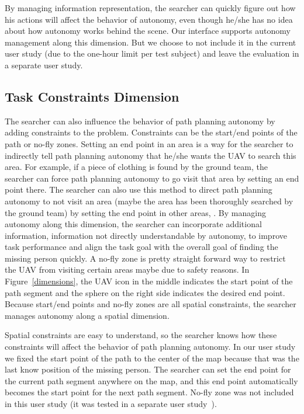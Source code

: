 \documentclass[journal]{IEEEtran}
\begin{document}
By managing information representation, the searcher can quickly figure out how his actions will affect the behavior of autonomy, even though he/she has no idea about how autonomy works behind the scene. Our interface supports autonomy management along this dimension. But we choose to not include it in the current user study (due to the one-hour limit per test subject) and leave the evaluation in a separate user study.

\subsection{Task Constraints Dimension}

The searcher can also influence the behavior of path planning autonomy by adding constraints to the problem. Constraints can be the start/end points of the path or no-fly zones. Setting an end point in an area is a way for the searcher to indirectly tell path planning autonomy that he/she wants the UAV to search this area. For example, if a piece of clothing is found by the ground team, the searcher can force path planning autonomy to go visit that area by setting an end point there. The searcher can also use this method to direct path planning autonomy to not visit an area (maybe the area has been thoroughly searched by the ground team) by setting the end point in other areas, . By managing autonomy along this dimension, the searcher can incorporate additional information, information not directly understandable by autonomy, to improve task performance and align the task goal with the overall goal of finding the missing person quickly. A no-fly zone is pretty straight forward way to restrict the UAV from visiting certain areas maybe due to safety reasons. In Figure~\ref{dimensions}, the UAV icon in the middle indicates the start point of the path segment and the sphere on the right side indicates the desired end point. Because start/end points and no-fly zones are all spatial constraints, the searcher manages autonomy along a spatial dimension.

Spatial constraints are easy to understand, so the searcher knows how these constraints will affect the behavior of path planning autonomy. In our user study we fixed the start point of the path to the center of the map because that was the last know position of the missing person. The searcher can set the end point for the current path segment anywhere on the map, and this end point automatically becomes the start point for the next path segment. No-fly zone was not included in this user study (it was tested in a separate user study~\cite{Clark2013Hierarchical}).
\end{document}
